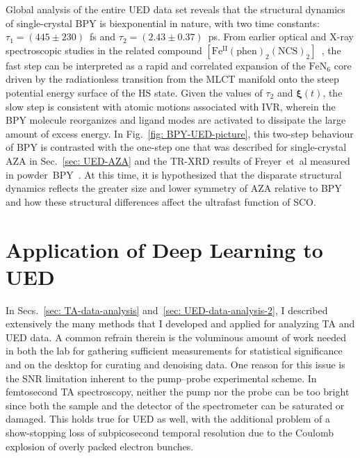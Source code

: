 Global analysis of the entire UED data set reveals that
the structural dynamics of single-crystal BPY is biexponential in nature,
with two time constants: $\tau_1 = (445 \pm 230)$~fs and $\tau_2 = (2.43 \pm 0.37)$~ps.
%
From earlier optical and X-ray spectroscopic studies in the related compound
$\mathrm{[Fe^{II}(phen)_2(NCS)_2]}$~\cite{Cammarata2014, Bertoni2015},
the fast step can be interpreted as a rapid and correlated expansion of the $\mathrm{FeN_6}$ core
driven by the radiationless transition from the MLCT manifold
onto the steep potential energy surface of the HS state.
%
Given the values of $\tau_2$ and $\boldsymbol{\xi}(t)$,
the slow step is consistent with atomic motions associated with IVR,
wherein the BPY molecule reorganizes and ligand modes are activated
to dissipate the large amount of excess energy.
%
In Fig.~\ref{fig: BPY-UED-picture}, this two-step behaviour of BPY
is contrasted with the one-step one that was described for single-crystal AZA
in Sec.~\ref{sec: UED-AZA} and the TR-XRD results of Freyer~et~al
measured in powder~BPY~\cite{Freyer2013}.
%
At this time, it is hypothesized that the disparate structural dynamics
reflects the greater size and lower symmetry of AZA relative to BPY
and how these structural differences affect the ultrafast function of SCO.

\section{Application of Deep Learning to UED}
\label{sec: future-deep}

In Secs.~\ref{sec: TA-data-analysis} and~\ref{sec: UED-data-analysis-2},
I described extensively the many methods that I developed and applied for analyzing TA and UED data.
%
A common refrain therein is the voluminous amount of work needed
in both the lab for gathering sufficient measurements for statistical significance
and on the desktop for curating and denoising data.
%
One reason for this issue is the SNR limitation inherent to the pump--probe experimental scheme.
In femtosecond TA spectroscopy, neither the pump nor the probe can be too bright
since both the sample and the detector of the spectrometer can be saturated or damaged.
This holds true for UED as well, with the additional problem of
a show-stopping loss of subpicosecond temporal resolution
due to the Coulomb explosion of overly packed electron bunches.

